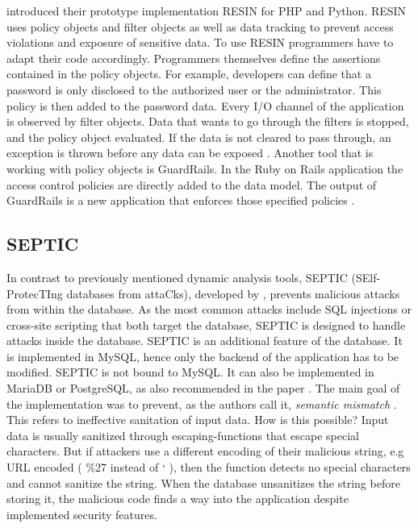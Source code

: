 \textcite[]{Yip2009} introduced their prototype implementation RESIN for PHP and Python. RESIN uses policy objects and filter objects as well as data tracking to prevent access violations and exposure of sensitive data. To use RESIN programmers have to adapt their code accordingly. Programmers themselves define the assertions contained in the policy objects. For example, developers can define that a password is only disclosed to the authorized user or the administrator. This policy is then added to the password data. Every I/O channel of the application is observed by filter objects. Data that wants to go through the filters is stopped, and the policy object evaluated. If the data is not cleared to pass through, an exception is thrown before any data can be exposed \autocite[3-7]{Yip2009}. Another tool that is working with policy objects is GuardRails\autocite[]{Felt2011}. In the Ruby on Rails application the access control policies are directly added to the data model. The output of GuardRails is a new application that enforces those specified policies \autocite[2-4]{Felt2011}.\newline

\subsection{SEPTIC}
In contrast to previously mentioned dynamic analysis tools, SEPTIC (SElf-ProtecTIng databases from attaCks), developed by \textcite[]{Medeiros2019}, prevents malicious attacks from within the database. As the most common attacks include SQL injections or cross-site scripting that both target the database, SEPTIC is designed to handle attacks inside the database. SEPTIC is an additional feature of the database. It is implemented in MySQL, hence only the backend of the application has to be modified. SEPTIC is not bound to MySQL. It can also be implemented in MariaDB or PostgreSQL, as also recommended in the paper \autocite[1185]{Medeiros2019}.\newline
The main goal of the implementation was to prevent, as the authors call it, \textit{semantic mismatch} \autocite[1168]{Medeiros2019}. This refers to ineffective sanitation of input data. How is this possible? Input data is usually sanitized through escaping-functions that escape special characters. But if attackers use a different encoding of their malicious string, e.g URL encoded ( \%27 instead of ` ), then the function detects no special characters and cannot sanitize the string. When the database unsanitizes the string before storing it, the malicious code finds a way into the application despite implemented security features.\newline


